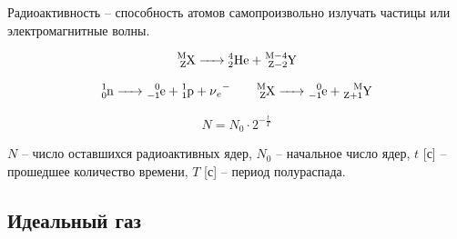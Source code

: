 \documentclass[12pt]{article}
\begin{document}
\begin{definition}
    Радиоактивность -- способность атомов самопроизвольно излучать частицы или электромагнитные волны.
\end{definition}
\begin{law}
    $$\ce{^M_ZX -> {^4_2He} + ^{M-4}_{Z-2}Y}$$
\end{law}
\begin{law}
    $$\ce{^1_0n -> ^0_{-1}e + ^1_1p + \nu_e-} \qquad \ce{^M_ZX -> ^0_{-1}e + ^{M}_{Z+1}Y}$$
\end{law}
\begin{law}
    $$N=N_0\cdot 2^{-\frac{t}{T}}$$
    \begin{center}
        \begin{minipage}{12cm}
            $N$ -- число оставшихся радиоактивных ядер, $N_0$ -- начальное число ядер, $t$ [с] -- прошедшее количество времени, $T$ [с] -- период полураспада.
        \end{minipage}
    \end{center}
\end{law}

\subsection{Идеальный газ}
\end{document}
